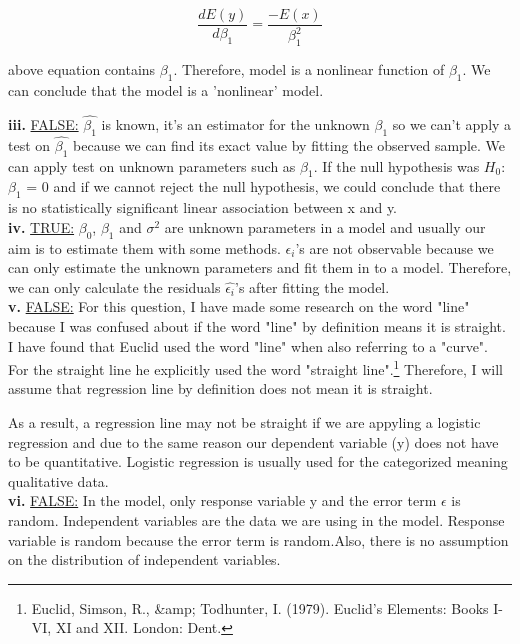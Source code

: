 \documentclass{article}
\begin{document}
\begin{equation}
\frac{dE(y)}{d\beta_1} = \frac{-E(x)}{\beta_1^2}
\end{equation}

above equation contains $\beta_1$. Therefore, model is a nonlinear function of $\beta_1$. We can conclude that the model is a 'nonlinear' model.

\newpage

\textbf{iii.} \underline{FALSE:} $\hat{\beta_1}$ is known, it's an estimator for the unknown $\beta_1$ so we can't apply a test on $\hat{\beta_1}$ because we can find its exact value by fitting the observed sample. We can apply test on unknown parameters such as $\beta_1$. If the null hypothesis was $H_0$: $\beta_1$ = 0 and if we cannot reject the null hypothesis, we could conclude that there is no statistically significant linear association between x and y.
\\

\textbf{iv.} \underline{TRUE:} $\beta_0$, $\beta_1$ and $\sigma^2$ are unknown parameters in a model and usually our aim is to estimate them with some methods. $\epsilon_i$'s are not observable because we can only estimate the unknown parameters and fit them in to a model. Therefore, we can only calculate the residuals $\hat{\epsilon_i}$'s after fitting the model. 
\\

\textbf{v.} \underline{FALSE:} For this question, I have made some research on the word "line" because I was confused about if the word "line" by definition means it is straight. I have found that Euclid used the word "line" when also referring to a "curve". For the straight line he explicitly used the word "straight line".\footnote{Euclid, Simson, R., &amp; Todhunter, I. (1979). Euclid's Elements: Books I-VI, XI and XII. London: Dent.} Therefore, I will assume that regression line by definition does not mean it is straight. 

As a result, a regression line may not be straight if we are appyling a logistic regression and due to the same reason our dependent variable (y) does not have to be quantitative. Logistic regression is usually used for the categorized meaning qualitative data.
\\

\textbf{vi.} \underline{FALSE:} In the model, only response variable y and the error term $\epsilon$ is random. Independent variables are the data we are using in the model.
Response variable is random because the error term is random.Also, there is no assumption on the distribution of independent variables. 
\end{document}
